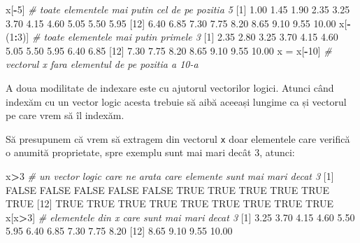 \documentclass[]{article}
\newenvironment{Shaded}{\begin{snugshade}}{\end{snugshade}}
\newcommand{\DecValTok}[1]{\textcolor[rgb]{0.00,0.00,0.81}{#1}}
\newcommand{\FloatTok}[1]{\textcolor[rgb]{0.00,0.00,0.81}{#1}}
\newcommand{\StringTok}[1]{\textcolor[rgb]{0.31,0.60,0.02}{#1}}
\newcommand{\CommentTok}[1]{\textcolor[rgb]{0.56,0.35,0.01}{\textit{#1}}}
\newcommand{\OtherTok}[1]{\textcolor[rgb]{0.56,0.35,0.01}{#1}}
\newcommand{\OperatorTok}[1]{\textcolor[rgb]{0.81,0.36,0.00}{\textbf{#1}}}
\newcommand{\NormalTok}[1]{#1}
\begin{document}
\begin{Shaded}
\begin{Highlighting}[]
\NormalTok{x[}\OperatorTok{-}\DecValTok{5}\NormalTok{] }\CommentTok{# toate elementele mai putin cel de pe pozitia 5 }
\NormalTok{ [}\DecValTok{1}\NormalTok{]  }\FloatTok{1.00}  \FloatTok{1.45}  \FloatTok{1.90}  \FloatTok{2.35}  \FloatTok{3.25}  \FloatTok{3.70}  \FloatTok{4.15}  \FloatTok{4.60}  \FloatTok{5.05}  \FloatTok{5.50}  \FloatTok{5.95}
\NormalTok{[}\DecValTok{12}\NormalTok{]  }\FloatTok{6.40}  \FloatTok{6.85}  \FloatTok{7.30}  \FloatTok{7.75}  \FloatTok{8.20}  \FloatTok{8.65}  \FloatTok{9.10}  \FloatTok{9.55} \FloatTok{10.00}
\NormalTok{x[}\OperatorTok{-}\NormalTok{(}\DecValTok{1}\OperatorTok{:}\DecValTok{3}\NormalTok{)] }\CommentTok{# toate elementele mai putin primele 3}
\NormalTok{ [}\DecValTok{1}\NormalTok{]  }\FloatTok{2.35}  \FloatTok{2.80}  \FloatTok{3.25}  \FloatTok{3.70}  \FloatTok{4.15}  \FloatTok{4.60}  \FloatTok{5.05}  \FloatTok{5.50}  \FloatTok{5.95}  \FloatTok{6.40}  \FloatTok{6.85}
\NormalTok{[}\DecValTok{12}\NormalTok{]  }\FloatTok{7.30}  \FloatTok{7.75}  \FloatTok{8.20}  \FloatTok{8.65}  \FloatTok{9.10}  \FloatTok{9.55} \FloatTok{10.00}
\NormalTok{x =}\StringTok{ }\NormalTok{x[}\OperatorTok{-}\DecValTok{10}\NormalTok{] }\CommentTok{# vectorul x fara elementul de pe pozitia a 10-a}
\end{Highlighting}
\end{Shaded}

A doua modilitate de indexare este cu ajutorul vectorilor logici. Atunci
când indexăm cu un vector logic acesta trebuie să aibă aceeași lungime
ca și vectorul pe care vrem să îl indexăm.

Să presupunem că vrem să extragem din vectorul \texttt{x} doar
elementele care verifică o anumită proprietate, spre exemplu sunt mai
mari decât 3, atunci:

\begin{Shaded}
\begin{Highlighting}[]
\NormalTok{x}\OperatorTok{>}\DecValTok{3} \CommentTok{# un vector logic care ne arata care elemente sunt mai mari decat 3}
\NormalTok{ [}\DecValTok{1}\NormalTok{] }\OtherTok{FALSE} \OtherTok{FALSE} \OtherTok{FALSE} \OtherTok{FALSE} \OtherTok{FALSE}  \OtherTok{TRUE}  \OtherTok{TRUE}  \OtherTok{TRUE}  \OtherTok{TRUE}  \OtherTok{TRUE}  \OtherTok{TRUE}
\NormalTok{[}\DecValTok{12}\NormalTok{]  }\OtherTok{TRUE}  \OtherTok{TRUE}  \OtherTok{TRUE}  \OtherTok{TRUE}  \OtherTok{TRUE}  \OtherTok{TRUE}  \OtherTok{TRUE}  \OtherTok{TRUE}  \OtherTok{TRUE}
\NormalTok{x[x}\OperatorTok{>}\DecValTok{3}\NormalTok{] }\CommentTok{# elementele din x care sunt mai mari decat 3}
\NormalTok{ [}\DecValTok{1}\NormalTok{]  }\FloatTok{3.25}  \FloatTok{3.70}  \FloatTok{4.15}  \FloatTok{4.60}  \FloatTok{5.50}  \FloatTok{5.95}  \FloatTok{6.40}  \FloatTok{6.85}  \FloatTok{7.30}  \FloatTok{7.75}  \FloatTok{8.20}
\NormalTok{[}\DecValTok{12}\NormalTok{]  }\FloatTok{8.65}  \FloatTok{9.10}  \FloatTok{9.55} \FloatTok{10.00}
\end{Highlighting}
\end{Shaded}
\end{document}
